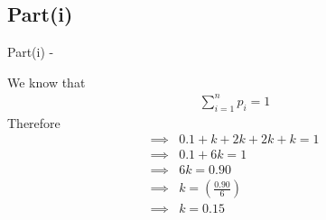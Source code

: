 \documentclass{beamer}
\begin{document}
\subsection{Part(i)}
\begin{frame}{Part(i) -}
    
    We know that
    \begin{align}
            \sum_{i = 1}^{n} p_i  = 1
        \end{align}
        Therefore
        \begin{align}
            \implies &0.1 + k + 2k + 2k + k = 1 \\
            \implies &0.1 + 6k = 1 \\
            \implies &6k = 0.90 \\
            \implies &k = \left(\frac{0.90}{6}\right) \\
            \implies &k = 0.15
        \end{align}
\end{frame}
\end{document}
